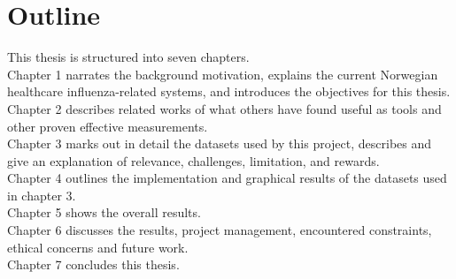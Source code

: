 \section{Outline}
This thesis is structured into seven chapters.
\newline \\Chapter 1 narrates the background motivation, explains the current Norwegian healthcare influenza-related systems, and introduces the objectives for this thesis.
\newline \\Chapter 2 describes related works of what others have found useful as tools and other proven effective measurements.
\newline \\Chapter 3 marks out in detail the datasets used by this project, describes and give an explanation of relevance, challenges, limitation, and rewards.
\newline \\Chapter 4 outlines the implementation and graphical results of the datasets used in chapter 3.
\newline \\Chapter 5 shows the overall results.
\newline \\Chapter 6 discusses the results, project management, encountered constraints, ethical concerns and future work.
\newline \\Chapter 7 concludes this thesis.


\newpage


